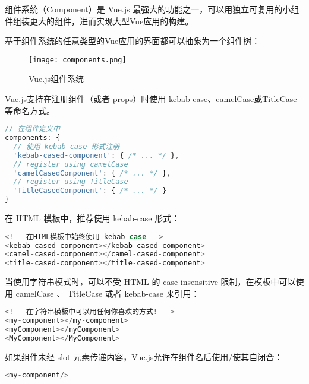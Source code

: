 组件系统（Component）是 Vue.js 最强大的功能之一，可以用独立可复用的小组件组装更大的组件，进而实现大型Vue应用的构建。

基于组件系统的任意类型的Vue应用的界面都可以抽象为一个组件树：

\begin{figure}[htbp]
\centering
\texttt{[image: components.png]}
\caption{Vue.js组件系统}
\end{figure}


Vue.js支持在注册组件（或者 props）时使用 kebab-case、camelCase或TitleCase等命名方式。




\begin{lstlisting}[language=JavaScript]
// 在组件定义中
components: {
  // 使用 kebab-case 形式注册
  'kebab-cased-component': { /* ... */ },
  // register using camelCase
  'camelCasedComponent': { /* ... */ },
  // register using TitleCase
  'TitleCasedComponent': { /* ... */ }
}
\end{lstlisting}

\begin{compactitem}
\item 在 HTML 模板中，推荐使用 kebab-case 形式：

\begin{lstlisting}[language=JavaScript]
<!-- 在HTML模板中始终使用 kebab-case -->
<kebab-cased-component></kebab-cased-component>
<camel-cased-component></camel-cased-component>
<title-cased-component></title-cased-component>
\end{lstlisting}

\item 当使用字符串模式时，可以不受 HTML 的 case-insensitive 限制，在模板中可以使用 camelCase 、 TitleCase 或者 kebab-case 来引用：

\begin{lstlisting}[language=JavaScript]
<!-- 在字符串模板中可以用任何你喜欢的方式! -->
<my-component></my-component>
<myComponent></myComponent>
<MyComponent></MyComponent>
\end{lstlisting}

\end{compactitem}

如果组件未经 slot 元素传递内容，Vue.js允许在组件名后使用/使其自闭合：



\begin{lstlisting}[language=JavaScript]
<my-component/>
\end{lstlisting}

